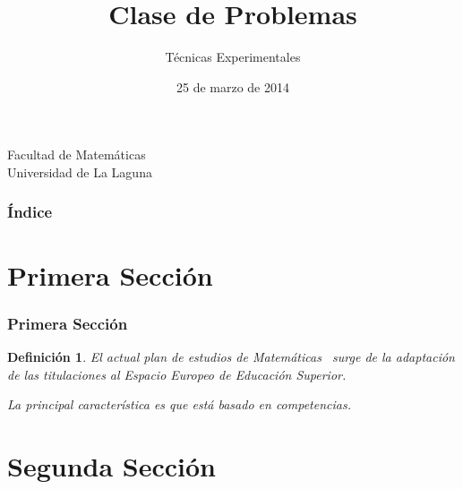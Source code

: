 \documentclass{beamer}
\title[Presentación con Beamer]{Clase de Problemas }
\author[Técnicas Experimentales]{Técnicas Experimentales}
\date[25-03-2014]{25 de marzo de 2014}
\newtheorem{definicion}{Definición}
\begin{document}
  
\begin{frame}

  \titlepage

  \begin{small}
    \begin{center}
     Facultad de Matemáticas \\
     Universidad de La Laguna
    \end{center}
  \end{small}

\end{frame}

\begin{frame}
  \frametitle{Índice}  
  \tableofcontents[pausesections]
\end{frame}


\section{Primera Sección}


\begin{frame}

\frametitle{Primera Sección}

\begin{definicion}
El actual plan de estudios de \alert{Matemáticas}~\cite{plan} surge de la adaptación de las 
titulaciones al Espacio Europeo de Educación Superior.

La principal característica es que está basado en competencias. 

\end{definicion}

\end{frame}

\section{Segunda Sección}
\end{document}
